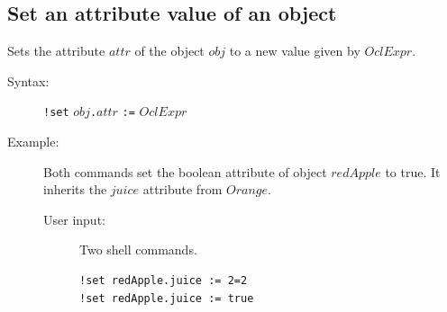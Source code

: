 \documentclass[a4paper,titlepage,oneside,final]{scrreprt} %
\begin{document}
\subsection{Set an attribute value of an object}
Sets the attribute $\mathit{attr}$ of the object $\mathit{obj}$ to a new value given by
$\mathit{OclExpr}$.
\begin{description}
\item[Syntax:] \verb+!set+ $\mathit{obj}$\verb+.+$\mathit{attr}$ \verb+:=+ $\mathit{OclExpr}$
\item[Example:] Both commands set the boolean attribute of object $\mathit{redApple}$
to true. It inherits the $\mathit{juice}$ attribute from $\mathit{Orange}$.
\begin{description}
\item[User input:] Two shell commands.
\begin{verbatim}
!set redApple.juice := 2=2
!set redApple.juice := true
\end{verbatim}
\end{description}
\end{description}
\end{document}
